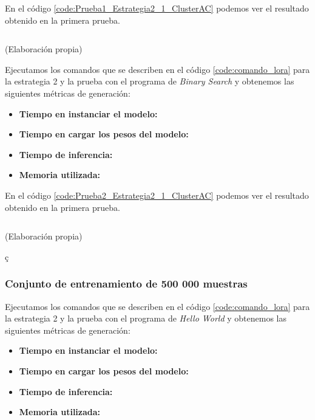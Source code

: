 En el código \ref{code:Prueba1_Estrategia2_1_ClusterAC} podemos ver el resultado obtenido
en la primera prueba.

\begin{mycode}
    \begin{verbatim}

    \end{verbatim}
    \caption[]{ (Elaboración propia)}
    \label{code:Prueba1_Estrategia2_1_ClusterAC}
\end{mycode}

Ejecutamos los comandos que se describen en el código \ref{code:comando_lora} para
la estrategia 2 y la prueba con el programa de \textit{Binary Search} y obtenemos
las siguientes métricas de generación:

\begin{itemize}
    \item \textbf{Tiempo en instanciar el modelo:}
    \item \textbf{Tiempo en cargar los pesos del modelo:}
    \item \textbf{Tiempo de inferencia:}
    \item \textbf{Memoria utilizada:}
\end{itemize}

En el código \ref{code:Prueba2_Estrategia2_1_ClusterAC} podemos ver el resultado obtenido
en la primera prueba.

\begin{mycode}
    \begin{verbatim}

    \end{verbatim}
    \caption[]{ (Elaboración propia)}
    \label{code:Prueba2_Estrategia2_1_ClusterAC}
\end{mycode}ç

\subsubsection{Conjunto de entrenamiento de 500 000 muestras}

Ejecutamos los comandos que se describen en el código \ref{code:comando_lora} para
la estrategia 2 y la prueba con el programa de \textit{Hello World} y obtenemos
las siguientes métricas de generación:

\begin{itemize}
    \item \textbf{Tiempo en instanciar el modelo:}
    \item \textbf{Tiempo en cargar los pesos del modelo:}
    \item \textbf{Tiempo de inferencia:}
    \item \textbf{Memoria utilizada:}
\end{itemize}

